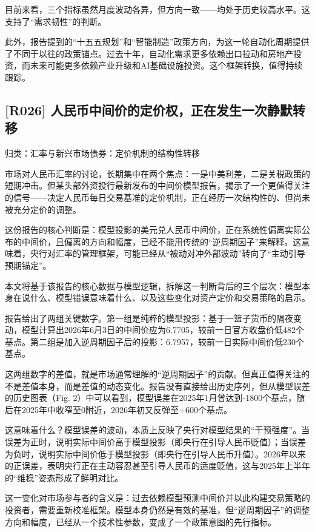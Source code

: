 \documentclass[11pt]{ctexart}
\begin{document}
目前来看，三个指标虽然月度波动各异，但方向一致——均处于历史较高水平。这支持了“需求韧性”的判断。

此外，报告提到的“十五五规划”和“智能制造”政策方向，为这一轮自动化周期提供了不同于以往的政策锚点。过去十年，自动化需求更多依赖出口拉动和房地产投资，而未来可能更多依赖产业升级和AI基础设施投资。这个框架转换，值得持续跟踪。

\subsection{[R026] 人民币中间价的定价权，正在发生一次静默转移}
{\small\color{refgray}归类：汇率与新兴市场债券：定价机制的结构性转移}

市场对人民币汇率的讨论，长期集中在两个焦点：一是中美利差，二是关税政策的短期冲击。但某头部外资投行最新发布的中间价模型报告，揭示了一个更值得关注的信号——决定人民币每日交易基准的定价机制，正在经历一次结构性的、但尚未被充分定价的调整。

这份报告的核心判断是：模型投影的美元兑人民币中间价，正在系统性偏离实际公布的中间价，且偏离的方向和幅度，已经不能用传统的“逆周期因子”来解释。这意味着，央行对汇率的管理框架，可能已经从“被动对冲外部波动”转向了“主动引导预期锚定”。

本文将基于该报告的核心数据与模型逻辑，拆解这一判断背后的三个层次：模型本身在说什么、模型错误意味着什么、以及这些变化对资产定价和交易策略的启示。

报告给出了两组关键数字。第一组是纯粹的模型投影：基于一篮子货币的隔夜变动，模型计算出2026年6月3日的中间价应为6.7705，较前一日官方收盘价低482个基点。第二组是加入逆周期因子后的投影：6.7957，较前一日实际中间价低230个基点。

这两组数字的差值，就是市场通常理解的“逆周期因子”的贡献。但真正值得关注的不是差值本身，而是差值的动态变化。报告没有直接给出历史序列，但从模型误差的历史图表（Fig. 2）中可以看到，模型误差在2025年1月曾达到-1800个基点，随后在2025年中收窄至0附近，2026年初又反弹至+600个基点。

这意味着什么？模型误差的波动，本质上反映了央行对模型结果的“干预强度”。当误差为正时，说明实际中间价高于模型投影（即央行在引导人民币贬值）；当误差为负时，说明实际中间价低于模型投影（即央行在引导人民币升值）。2026年以来的正误差，表明央行正在主动容忍甚至引导人民币的适度贬值，这与2025年上半年的“维稳”姿态形成了鲜明对比。

这一变化对市场参与者的含义是：过去依赖模型预测中间价并以此构建交易策略的投资者，需要重新校准框架。模型本身仍然是有效的基准，但“逆周期因子”的调整方向和幅度，已经从一个技术性参数，变成了一个政策意图的先行指标。
\end{document}
